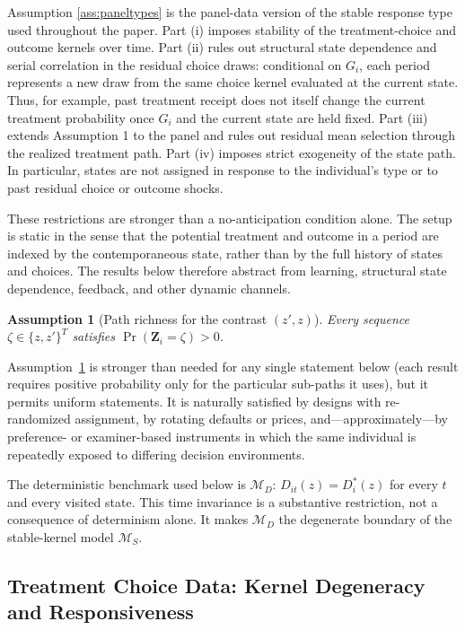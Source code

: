 \documentclass[11pt]{article}
\newtheorem{assumption}{Assumption}
\newcommand{\1}{\mathbf{1}}
\begin{document}
Assumption \ref{ass:paneltypes} is the panel-data version of the stable response type used
throughout the paper. Part (i) imposes stability of the treatment-choice and
outcome kernels over time. Part (ii) rules out structural state dependence and
serial correlation in the residual choice draws: conditional on \(G_i\), each
period represents a new draw from the same choice kernel evaluated at the
current state. Thus, for example, past treatment receipt does not itself change
the current treatment probability once \(G_i\) and the current state are held
fixed. Part (iii) extends Assumption 1 to the panel and rules out residual mean
selection through the realized treatment path. Part (iv) imposes strict
exogeneity of the state path. In particular, states are not assigned in
response to the individual's type or to past residual choice or outcome shocks.

These restrictions are stronger than a no-anticipation condition alone. The
setup is static in the sense that the potential treatment and outcome in a
period are indexed by the contemporaneous state, rather than by the full
history of states and choices. The results below therefore abstract from
learning, structural state dependence, feedback, and other dynamic channels.

\begin{assumption}[Path richness for the contrast $(z',z)$]
\label{ass:pathrich}
Every sequence $\zeta \in \{z, z'\}^{T}$ satisfies $\Pr(\mathbf{Z}_i = \zeta) > 0$.
\end{assumption}

Assumption~\ref{ass:pathrich} is stronger than needed for any single statement below (each result requires positive probability only for the particular sub-paths it uses), but it permits uniform statements. It is naturally satisfied by designs with re-randomized assignment, by rotating defaults or prices, and---approximately---by preference- or examiner-based instruments in which the same individual is repeatedly exposed to differing decision environments.

The deterministic benchmark used below is $\mathcal M_D$: $D_{it}(z)=D_i^{*}(z)$ for every $t$ and every visited state. This time invariance is a substantive restriction, not a consequence of determinism alone. It makes $\mathcal M_D$ the degenerate boundary of the stable-kernel model $\mathcal M_S$.

\subsection{Treatment Choice Data: Kernel Degeneracy and Responsiveness}
\label{subsec:panel-choice}
\end{document}

